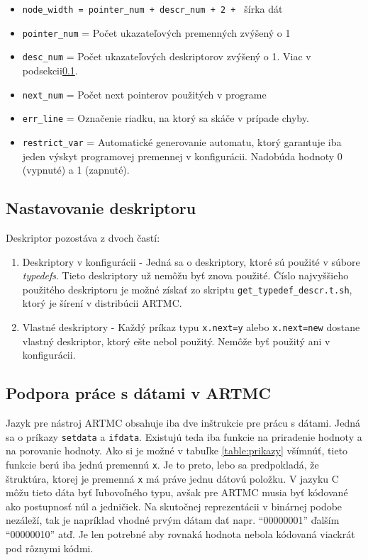 \begin{itemize}
\item \texttt{node\_width = pointer\_num + descr\_num + 2 + } šírka dát  
\item \texttt{pointer\_num} = Počet ukazateľových premenných zvýšený o 1
\item \texttt{desc\_num} = Počet ukazateľových deskriptorov zvýšený o 1. Viac v podsekcii\ref{kap_descr}.
\item \texttt{next\_num} = Počet next pointerov použitých v programe
\item \texttt{err\_line} = Označenie riadku, na ktorý sa skáče v prípade chyby.
\item \texttt{restrict\_var} = Automatické generovanie automatu, ktorý garantuje iba jeden výskyt programovej premennej v konfigurácii. Nadobúda hodnoty 0 (vypnuté) a 1 (zapnuté).
\end{itemize}


\subsection{Nastavovanie deskriptoru}
\label{kap_descr}
Deskriptor pozostáva z dvoch častí:
\begin{enumerate}
\item Deskriptory v konfigurácii - Jedná sa o deskriptory, ktoré sú použité v súbore \textit{typedefs}. Tieto deskriptory už nemôžu byť znova použité. Číslo najvyššieho použitého deskriptoru je možné získať zo skriptu \texttt{get\_typedef\_descr.t.sh}, ktorý je šírení v distribúcii ARTMC.
\item Vlastné deskriptory - Každý príkaz typu \texttt{x.next=y} alebo \texttt{x.next=new} dostane vlastný deskriptor, ktorý ešte nebol použitý. Nemôže byť použitý ani v konfigurácii.
\end{enumerate}

\subsection{Podpora práce s dátami v ARTMC}
Jazyk pre nástroj ARTMC obsahuje iba dve inštrukcie pre prácu s dátami. Jedná sa o príkazy \texttt{setdata} a \texttt{ifdata}. Existujú teda iba funkcie na priradenie hodnoty a na porovanie hodnoty. Ako si je možné v tabuľke \ref{table:prikazy} všímnúť, tieto funkcie berú iba jednú premennú \texttt{x}. Je to preto, lebo sa predpokladá, že štruktúra, ktorej je premenná \texttt{x} má práve jednu dátovú položku. V jazyku C môžu tieto dáta byť ľubovoľného typu, avšak pre ARTMC musia byť kódované ako postupnosť núl a jedničiek. Na skutočnej reprezentácii v binárnej podobe nezáleží, tak je napríklad vhodné prvým dátam dať napr. 	``00000001'' ďalším ``00000010'' atď. Je len potrebné aby rovnaká hodnota nebola kódovaná viackrát pod rôznymi kódmi.

